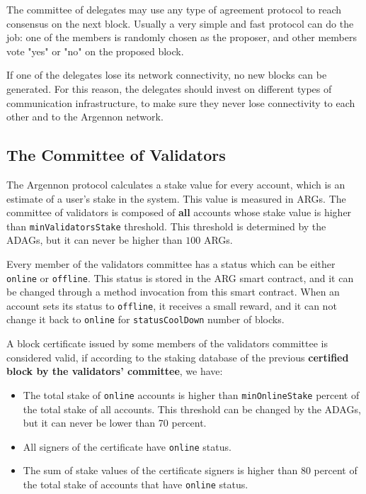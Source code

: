 The committee of delegates may use any type of agreement protocol to reach consensus on the
next block. Usually a very simple and fast protocol can do the job: one of the members
is randomly chosen as the proposer, and other members vote "yes" or "no" on the proposed block.

If one of the delegates lose its network connectivity, no new blocks can be generated. For this reason,
the delegates should invest on different types of communication infrastructure, to make sure they never lose
connectivity to each other and to the Argennon network.

\subsection{The Committee of Validators}\label{subsec:validators-committee}

The Argennon protocol calculates a stake value for every account, which is an estimate of a user's stake in the
system. This value is measured in ARGs. The committee of validators is composed of
\textbf{all} accounts whose stake value is higher than \texttt{minValidatorsStake} threshold. This
threshold is determined by the ADAGs, but it can never be higher
than $100$ ARGs.

Every member of the validators committee has a status which can be either \texttt{online} or \texttt{offline}.
This status is stored in the ARG smart contract, and it can be changed through a method invocation
from this smart contract. When an account sets its status to \texttt{offline}, it receives a small reward, and
it can not change it back to \texttt{online} for \texttt{statusCoolDown} number of blocks.


A block certificate issued by some members of the validators committee is considered valid, if according to
the staking database of the previous \textbf{certified block by the validators' committee}, we have:
\begin{itemize}
    \item The total stake of \texttt{online} accounts is higher than \texttt{minOnlineStake} percent of the
    total stake of all accounts. This threshold can be changed by the ADAGs, but it can never be lower
    than 70 percent.
    \item All signers of the certificate have \texttt{online} status.
    \item The sum of stake values of the certificate signers is higher than 80 percent of the total stake
    of accounts that have \texttt{online} status.
\end{itemize}

